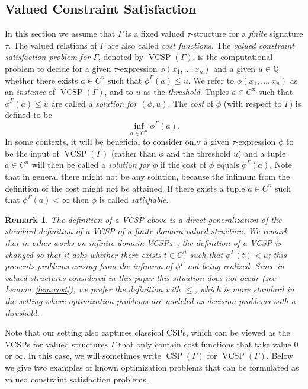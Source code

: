 \documentclass[nonacm]{acmart}
\DeclareMathOperator{\VCSP}{VCSP}
\DeclareMathOperator{\CSP}{CSP}
\newtheorem{remark}[theorem]{Remark}
\begin{document}
\subsection{Valued Constraint Satisfaction} 
\label{sect:vcsp}
In this section we assume that
 $\Gamma$ is a fixed valued $\tau$-structure for a 
 \emph{finite} signature $\tau$. 
 The valued relations of $\Gamma$ are also called \emph{cost functions}. 
The \emph{valued constraint satisfaction problem for $\Gamma$}, denoted by \emph{$\VCSP(\Gamma)$}, is the computational
problem to decide for a given $\tau$-expression $\phi(x_1,\dots,x_n)$ 
and a given $u \in {\mathbb Q}$
whether there exists
$a \in C^n$ such that $\phi^{\Gamma}(a) \leq u$. 
We refer to $\phi(x_1,\dots,x_n)$ as an \emph{instance} of $\VCSP(\Gamma)$,
and to $u$ as the \emph{threshold}. 
Tuples $a \in C^n$ such that $\phi^{\Gamma}(a) \leq u$ are called a \emph{solution for $(\phi,u)$}.
The \emph{cost}  of $\phi$ (with respect to $\Gamma$) is defined to be
$$\inf_{a \in C^n} \phi^{\Gamma}(a).$$
In some contexts, it will be beneficial to consider only a given $\tau$-expression $\phi$ to be the input of $\VCSP(\Gamma)$ (rather than $\phi$ and the threshold $u$) and a tuple $a \in C^n$ will then be called a \emph{solution for $\phi$} if the cost of $\phi$ equals $\phi^{\Gamma}(a)$.
Note that in general there might not be any solution, because the infimum from the definition of the cost might not be attained. 
If there exists a tuple $a \in C^n$ such that $\phi^{\Gamma}(a) < \infty$ then $\phi$ is called \emph{satisfiable}.

\begin{remark}\label{rem:def-vcsp}
The definition of a VCSP above is a direct generalization of the standard definition of a VCSP of a finite-domain valued structure. We remark that in other works on infinite-domain VCSPs~\cite{SchneiderViola, ViolaThesis}, the definition of a VCSP is changed so that it asks whether there exists $t \in C^n$ such that $\phi^\Gamma(t) < u$; this prevents problems arising from the infimum of $\phi^\Gamma$ not being realized. Since 
in valued structures considered in this paper this situation does not occur (see Lemma~\ref{lem:cost}), we prefer the definition with $\leq$, which is more standard in the setting where optimization problems are modeled as decision problems with a threshold.
\end{remark}

Note that our setting also captures classical CSPs, which can be viewed as the VCSPs for valued structures $\Gamma$ that only contain cost functions that take value $0$ or $\infty$. In this case, we will sometimes write $\CSP(\Gamma)$ for $\VCSP(\Gamma)$. Below we give two examples of known optimization problems that can be formulated as valued constraint satisfaction problems.
\end{document}
